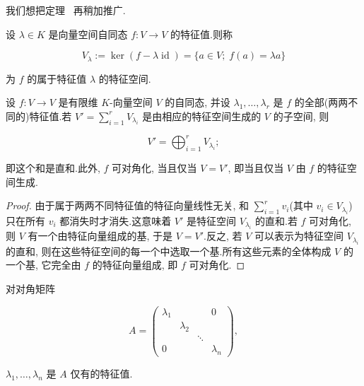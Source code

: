 我们想把定理~ 再稍加推广.

\begin{definition}[特征空间]\label{def:6.1.11}
设 $\lambda \in K$ 是向量空间自同态 $f \colon V \longrightarrow V$ 的特征值.则称

\[
V_\lambda := \ker(f - \lambda \operatorname{id}) = \{a \in V;\; f(a) = \lambda a\}\]

为 $f$ 的属于特征值 $\lambda$ 的特征空间.
\end{definition}

\begin{corollary}\label{cor:6.1.12}
设 $f \colon V \longrightarrow V$ 是有限维 $K$-向量空间 $V$ 的自同态, 并设 $\lambda_1, \ldots, \lambda_r$ 是 $f$ 的全部(两两不同的)特征值.若 $V' = \sum_{i = 1}^{r} V_{\lambda_i}$ 是由相应的特征空间生成的 $V$ 的子空间, 则

\[
V' = \bigoplus_{i = 1}^{r} V_{\lambda_i};\]

即这个和是直和.此外, $f$ 可对角化, 当且仅当 $V = V'$, 即当且仅当 $V$ 由 $f$ 的特征空间生成.
\end{corollary}

\begin{proof}
由于属于两两不同特征值的特征向量线性无关, 和 $\sum_{i = 1}^{r} v_i$(其中 $v_i \in V_{\lambda_i}$) 只在所有 $v_i$ 都消失时才消失.这意味着 $V'$ 是特征空间 $V_{\lambda_i}$ 的直和.若 $f$ 可对角化, 则 $V$ 有一个由特征向量组成的基, 于是 $V = V'$.反之, 若 $V$ 可以表示为特征空间 $V_{\lambda_i}$ 的直和, 则在这些特征空间的每一个中选取一个基.所有这些元素的全体构成 $V$ 的一个基, 它完全由 $f$ 的特征向量组成, 即 $f$ 可对角化.
\end{proof}

\begin{corollary}\label{cor:6.1.13}
对对角矩阵

\[
A = \left(\begin{array}{cccc}
\lambda_1 & & & 0 \\
 & \lambda_2 & & \\
 & & \ddots & \\
0 & & & \lambda_n
\end{array}\right),\]

$\lambda_1, \ldots, \lambda_n$ 是 $A$ 仅有的特征值.
\end{corollary}

